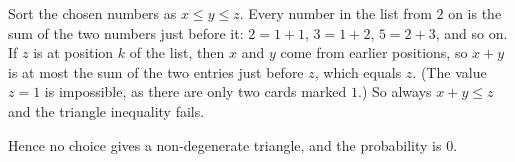 Sort the chosen numbers as $x\le y\le z$. Every number in the list from $2$ on is the sum of the two numbers just before it: $2=1+1$, $3=1+2$, $5=2+3$, and so on. If $z$ is at position $k$ of the list, then $x$ and $y$ come from earlier positions, so $x+y$ is at most the sum of the two entries just before $z$, which equals $z$. (The value $z=1$ is impossible, as there are only two cards marked $1$.) So always $x+y\le z$ and the triangle inequality fails.

Hence no choice gives a non-degenerate triangle, and the probability is $\boxed{0}$.
